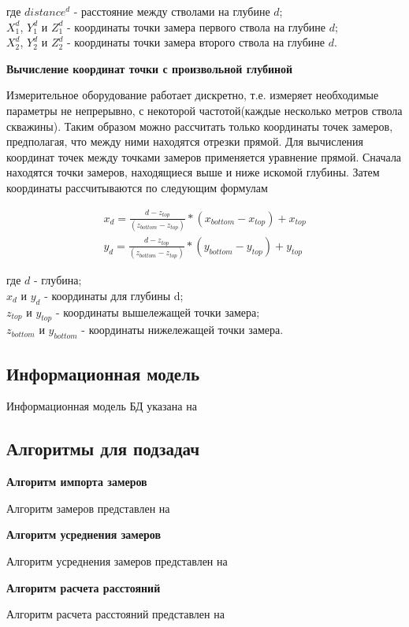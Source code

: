 где $ distance^d $ - расстояние между стволами на глубине $ d $;\\
$ X_1^d $, $ Y_1^d $ и $ Z_1^d $ - координаты точки замера первого ствола на глубине $ d $;\\
$ X_2^d $, $ Y_2^d $ и $ Z_2^d $ - координаты точки замера второго ствола на глубине $ d $.

\textbf{Вычисление координат точки с произвольной глубиной}

Измерительное оборудование работает дискретно, т.е. измеряет необходимые параметры не непрерывно, с некоторой частотой(каждые несколько метров
ствола скважины). Таким образом можно рассчитать только координаты точек замеров, предполагая, что между ними находятся отрезки прямой. Для вычисления
координат точек между точками замеров применяется уравнение прямой. Сначала находятся точки замеров, находящиеся выше и ниже искомой глубины. Затем
координаты рассчитываются по следующим формулам

\begin{equation}
  \begin{split}
    x_d = \frac{d-z_{top}}{(z_{bottom}-z_{top})}*(x_{bottom}-x_{top})+x_{top} \\
    y_d = \frac{d-z_{top}}{(z_{bottom}-z_{top})}*(y_{bottom}-y_{top})+y_{top}
  \end{split}
\end{equation}

где $ d $ - глубина;\\
$ x_d $ и $ y_d $ - координаты для глубины d; \\
$ z_{top} $ и $ y_{top} $ - координаты вышележащей точки замера;\\
$ z_{bottom} $ и $ y_{bottom} $ - координаты нижележащей точки замера.


\subsection{Информационная модель}

Информационная модель БД указана на 


\subsection{Алгоритмы для подзадач}

\textbf{Алгоритм импорта замеров}

Алгоритм  замеров представлен на 


\textbf{Алгоритм усреднения замеров}

Алгоритм усреднения замеров представлен на 


\textbf{Алгоритм расчета расстояний}

Алгоритм расчета расстояний представлен на 

